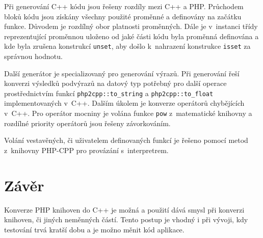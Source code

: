 \documentclass[czech]{ExcelAtFIT}
\newcommand{\function}[1]{\texttt{#1}}
\begin{document}
	Při generování C++ kódu jsou řešeny rozdíly mezi C++ a PHP. Průchodem bloků kódu jsou získány všech\-ny použité proměnné a definovány na začátku funkce. Důvodem je rozdílný obor platnosti proměnných. Dále je v~instanci třídy reprezentující proměnnou uloženo od jaké části kódu byla proměnná definována a kde byla zrušena konstrukcí \function{unset}, aby došlo k~nahrazení konstrukce \function{isset} za správnou hodnotu.

	Další generátor je specializovaný pro generování výrazů. Při generování řeší konverzi výsledků pod\-vý\-ra\-zů na datový typ potřebný pro další operace pro\-střed\-nic\-tvím funkcí \function{php2cpp::to\_string} a \function{php2\-cpp\-::to\_\-float} implementovaných v~C++. Dalším ú\-ko\-lem je konverze operátorů chybějících v~C++. Pro operátor mocniny je volána funkce \function{pow} z~matematické knihovny a rozdílné priority operátorů jsou řešeny zá\-vor\-ko\-vá\-ním.

	Volání vestavěných, či uživatelem definovaných funkcí je řešeno pomocí metod z~knihovny PHP-CPP pro provázání s~interpretrem.









\section{Závěr}
\label{sec:Conclusions}


	Konverze PHP knihoven do C++ je možná a použití dává smysl při konverzi knihoven, či jiných neměnných částí. Tento postup je vhodný i při vývoji, kdy testování trvá kratší dobu a je možno měnit kód aplikace.
\end{document}
